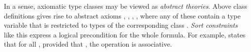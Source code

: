 \begin{isabellebody}
\begin{isamarkuptext}
\end{isamarkuptext}%
%
%
\begin{isamarkuptext}%
In a sense, axiomatic type classes may be viewed as \emph{abstract
 theories}.  Above class definitions gives rise to abstract axioms
 , , , , where any of these contain a type variable 
 that is restricted to types of the corresponding class .
 \emph{Sort constraints} like this express a logical precondition for
 the whole formula.  For example,  states that for all
 \isa{{\isasymtau}}, provided that , the operation
 \isa{{\isasymodot}\ {\isasymColon}\ {\isasymtau}\ {\isasymRightarrow}\ {\isasymtau}\ {\isasymRightarrow}\ {\isasymtau}} is associative.


\end{isamarkuptext}
\end{isabellebody}
